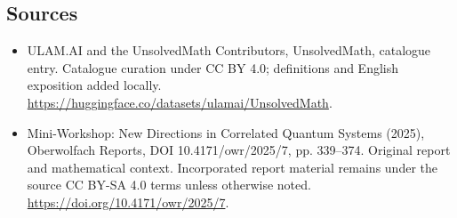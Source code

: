 \documentclass[11pt]{article}
\begin{document}
\subsection{Sources}
\begin{itemize}
\item[\hypertarget{source:statement:1}{S1}] ULAM.AI and the UnsolvedMath Contributors, UnsolvedMath, catalogue entry. Catalogue curation under CC BY 4.0; definitions and English exposition added locally.
\url{https://huggingface.co/datasets/ulamai/UnsolvedMath}.
\item[\hypertarget{source:statement:2}{S2}] Mini-Workshop: New Directions in Correlated Quantum Systems (2025), Oberwolfach Reports, DOI 10.4171/owr/2025/7, pp. 339--374. Original report and mathematical context. Incorporated report material remains under the source CC BY-SA 4.0 terms unless otherwise noted.
\url{https://doi.org/10.4171/owr/2025/7}.
\end{itemize}
\label{end:statement}
\end{document}

